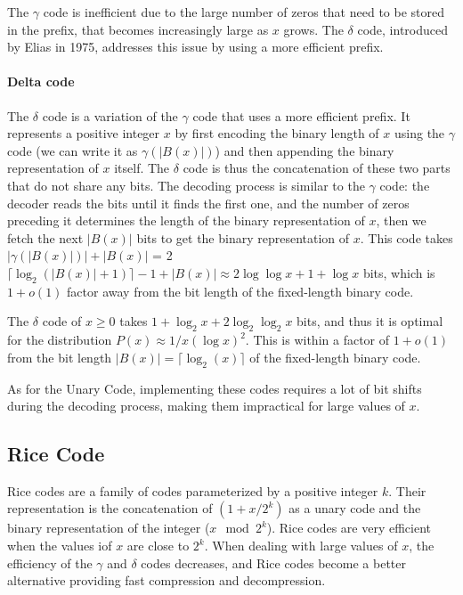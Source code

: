 \noindent The $\gamma$ code is inefficient due to the large number of zeros that need to be stored in the prefix, that becomes increasingly large as $x$ grows. The $\delta$ code, introduced by Elias in 1975, addresses this issue by using a more efficient prefix.

\paragraph{Delta code} The $\delta$ code is a variation of the $\gamma$ code that uses a more efficient prefix. It represents a positive integer $x$ by first encoding the binary length of $x$ using the $\gamma$ code (we can write it as $\gamma(|B(x)|)$) and then appending the binary representation of $x$ itself. The $\delta$ code is thus the concatenation of these two parts that do not share any bits. The decoding process is similar to the $\gamma$ code: the decoder reads the bits until it finds the first one, and the number of zeros preceding it determines the length of the binary representation of $x$, then we fetch the next $|B(x)|$ bits to get the binary representation of $x$. This code takes $|\gamma(|B(x)|)| + |B(x)|$ = 2$\lceil\log_2(|B(x)| + 1) \rceil - 1 + |B(x)| \approx 2 \log \log x + 1 + \log x$ bits, which is $1 + o(1)$ factor away from the bit length of the fixed-length binary code. \cite{ferragina2023pearls}

\begin{theorem}
    The $\delta$ code of $x \geq 0$ takes $1 + \log_2x + 2\log_2 \log_2 x$ bits, and thus it is optimal for the distribution $P(x)\approx1/x(\log x)^2$. This is within a factor of $1 + o(1)$ from the bit length $|B(x)| = \lceil\log_2(x)\rceil$ of the fixed-length binary code. \cite{ferragina2023pearls}
\end{theorem}

\noindent As for the Unary Code, implementing these codes requires a lot of bit shifts during the decoding process, making them impractical for large values of $x$.

\subsection{Rice Code}

Rice codes \cite{rice1979some} are a family of codes parameterized by a positive integer $k$. Their representation is the concatenation of $(1+x/2^k)$ as a unary code and the binary representation of the integer ($x \mod 2^k$). Rice codes are very efficient when the values iof $x$ are close to $2^k$. When dealing with large values of $x$, the efficiency of the $\gamma$ and $\delta$ codes decreases, and Rice codes become a better alternative providing fast compression and decompression. \vspace{0.4cm}

